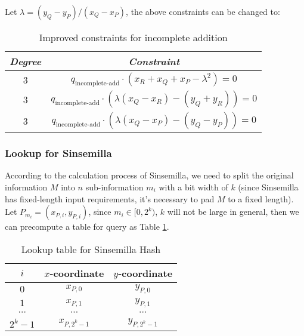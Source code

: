 Let $\lambda=(y_Q-y_P)/(x_Q-x_P)$, the above constraints can be changed to:
\begin{table}[!ht]
    \centering
    \begin{tabular}{|c|c|}
        \hline
        \emph{Degree} & \emph{Constraint} \\
        \hline
        3 & $q_\text{incomplete-add} \cdot(x_R + x_Q + x_P - \lambda^2) = 0$ \\
        3 & $q_\text{incomplete-add} \cdot(\lambda(x_Q - x_R) - (y_Q + y_R)) = 0$ \\
        3 & $q_\text{incomplete-add} \cdot(\lambda(x_Q - x_P) - (y_Q - y_P)) = 0$ \\
        \hline
    \end{tabular}
    \caption{Improved constraints for incomplete addition}
\end{table}

\subsubsection{Lookup for Sinsemilla}

According to the calculation process of Sinsemilla, we need to split the original information $M$ into $n$ sub-information $m_i$ with a bit width of $k$ (since Sinsemilla has fixed-length input requirements, it's necessary to pad $M$ to a fixed length). Let $P_{m_i} = (x_{P,i}, y_{P,i})$, since $m_i \in [0,2^k)$, $k$ will not be large in general, then we can precompute a table for query as Table \ref{table:lookup-table-for-sinsemilla-hash}.

\begin{table}[!ht]
    \centering
    \begin{tabular}{|c|c|c|}
        \hline
        $i$ & $x$-coordinate & $y$-coordinate \\
        \hline
        $0$ & $x_{P,0}$ & $y_{P,0}$ \\
        $1$ & $x_{P,1}$ & $y_{P,1}$ \\
        $\cdots$ & $\cdots$ & $\cdots$ \\
        $2^k-1$ & $x_{P,2^k-1}$ & $y_{P,2^k-1}$ \\
        \hline
    \end{tabular}
    \caption{Lookup table for Sinsemilla Hash}
    \label{table:lookup-table-for-sinsemilla-hash}
\end{table}
